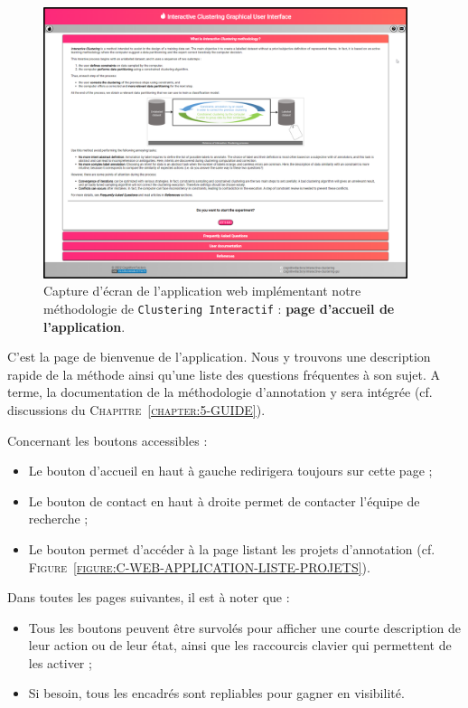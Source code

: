 			\begin{figure}[H]
				\centering
				\includegraphics[width=0.95\textwidth]{figures/interactive-clustering-application-accueil-application}
				\caption{
					Capture d'écran de l'application web implémentant notre méthodologie de \texttt{Clustering Interactif} : \textbf{page d'accueil de l'application}.
				}
				\label{figure:C-WEB-APPLICATION-ACCUEIL}
			\end{figure}
			
			C'est la page de bienvenue de l'application.
			Nous y trouvons une description rapide de la méthode ainsi qu'une liste des questions fréquentes à son sujet.
			A terme, la documentation de la méthodologie d'annotation y sera intégrée (cf. discussions du \textsc{Chapitre~\ref{chapter:5-GUIDE}}).
			
			Concernant les boutons accessibles :
			\begin{itemize}
				\item Le bouton d'accueil en haut à gauche redirigera toujours sur cette page ;
				\item Le bouton de contact en haut à droite permet de contacter l'équipe de recherche ;
				\item Le bouton  permet d'accéder à la page listant les projets d'annotation (cf. \textsc{Figure~\ref{figure:C-WEB-APPLICATION-LISTE-PROJETS}}).
			\end{itemize}
			
			\begin{leftBarInformation}
				Dans toutes les pages suivantes, il est à noter que :
				\begin{itemize}
					\item Tous les boutons peuvent être survolés pour afficher une courte description de leur action ou de leur état, ainsi que les raccourcis clavier qui permettent de les activer ;
					\item Si besoin, tous les encadrés sont repliables pour gagner en visibilité.
				\end{itemize}
			\end{leftBarInformation}
		
